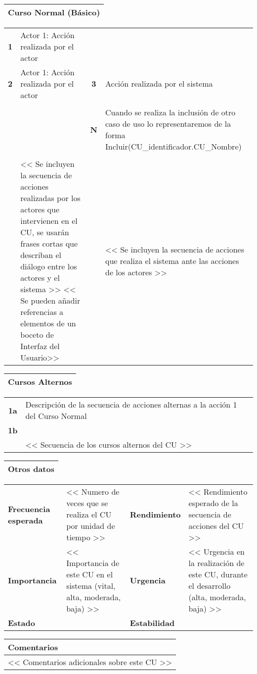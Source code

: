 \begin{table}[H]
	\begin{tabularx}{\textwidth}{X}
		\textbf{Curso Normal (Básico)}\\ \hline
	\end{tabularx}
	\begin{tabularx}{\textwidth}{cXcX}
		\textbf{1} & Actor 1: Acción realizada por el actor & & \\
		\textbf{2} & Actor 1: Acción realizada por el actor & \textbf{3} & Acción realizada por el sistema \\
		 & & & \\
		 & & \textbf{N} &  Cuando se realiza la inclusión de otro caso de uso lo representaremos de la forma Incluir(CU\_identificador.CU\_Nombre)\\
		 & & & \\
		 & << Se incluyen la secuencia de acciones realizadas por los actores que intervienen en el CU, se usarán frases cortas que describan el diálogo entre los actores y el sistema >> << Se pueden añadir referencias a elementos de un boceto de Interfaz del Usuario>> & & << Se incluyen la secuencia de acciones que realiza el sistema ante las acciones de los actores >>
	\end{tabularx}
	
	\begin{tabularx}{\textwidth}{X}
		\textbf{Cursos Alternos}\\ \hline
	\end{tabularx}
	\begin{tabularx}{\textwidth}{cX}
		\textbf{1a} & Descripción de la secuencia de acciones alternas a la acción 1 del Curso Normal\\
		\textbf{1b} & \\
		 & << Secuencia de los cursos alternos del CU >>
	\end{tabularx}
\end{table}

\begin{table}[H]
	\begin{tabularx}{\textwidth}{X}
		\textbf{Otros datos}\\ \hline
	\end{tabularx}
	\begin{tabularx}{\textwidth}{lXlX}
		\textbf{Frecuencia esperada} & << Numero de veces que se realiza el CU por unidad de tiempo >> & \textbf{Rendimiento} & << Rendimiento esperado de la secuencia de acciones del CU >>\\
		\textbf{Importancia} & << Importancia de este CU en el sistema (vital, alta, moderada, baja) >> & \textbf{Urgencia} & << Urgencia en la realización de este CU, durante el desarrollo (alta, moderada, baja) >>\\
		\textbf{Estado} &  & \textbf{Estabilidad} & \\
	\end{tabularx}
	
	\begin{tabularx}{\textwidth}{X}
		\textbf{Comentarios}\\ \hline
		<< Comentarios adicionales sobre este CU >>
	\end{tabularx}
\end{table}